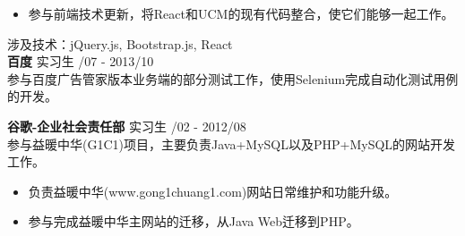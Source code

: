 \documentclass[a4paper]{article}
\newenvironment{changemargin}[2]{%
  \begin{list}{}{%
    \setlength{\topsep}{0pt}%
    \setlength{\leftmargin}{#1}%
    \setlength{\rightmargin}{#2}%
    \setlength{\listparindent}{\parindent}%
    \setlength{\itemindent}{\parindent}%
    \setlength{\parsep}{\parskip}%
  }%
  \item[]}{\end{list}
}
\newenvironment{body} {
	\vspace*{-16pt}
	\begin{changemargin}{-0.5in}{-0.5in}
  }	
	{\end{changemargin}
}
\begin{document}
\begin{body}
\begin{itemize}
	\end{itemize}
	\vspace*{-12pt}
	\begin{itemize} \itemsep -0pt  %
		\item 参与前端技术更新，将{\fontarial React}和{\fontarial UCM}的现有代码整合，使它们能够一起工作。\\
	\end{itemize}
	\vspace*{-4pt}
	涉及技术：{\fontarial jQuery.js, Bootstrap.js, React}\\

	\vspace{10pt}
	\textbf{百度} \hfill 实习生 {/07 - 2013/10}\\ 
	\smallskip
	参与百度广告管家{}版本业务端的部分测试工作，使用{\fontarial Selenium}完成自动化测试用例的开发。

	\vspace{10pt}
	\textbf{谷歌-企业社会责任部} \hfill 实习生 {/02 - 2012/08}\\ 
	\smallskip
	参与益暖中华{\fontarial (G1C1)}项目，主要负责{\fontarial Java+MySQL}以及{\fontarial PHP+MySQL}的网站开发工作。\\ 
	\vspace*{-6pt}
	\begin{itemize} \itemsep -0pt  %
		\item 负责益暖中华{\fontarial(www.gong1chuang1.com)}网站日常维护和功能升级。\\
	\end{itemize}
	\vspace*{-12pt}
	\begin{itemize} \itemsep -0pt  %
		\item 参与完成益暖中华主网站的迁移，从{\fontarial Java Web}迁移到{\fontarial PHP}。\\
	\end{itemize}

\end{body}
\end{document}
